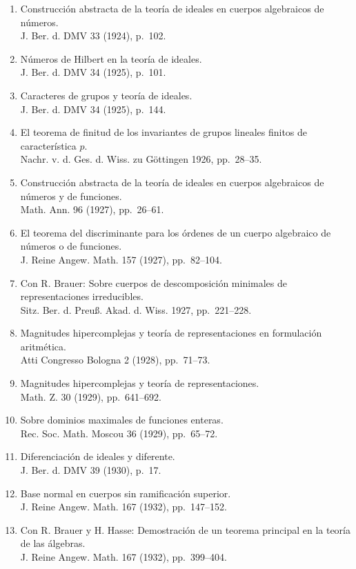 \begin{enumerate}
\item Construcción abstracta de la teoría de ideales en cuerpos algebraicos de números.\\ J. Ber. d. DMV 33 (1924), p.~102.
\item Números de Hilbert en la teoría de ideales.\\ J. Ber. d. DMV 34 (1925), p.~101.
\item Caracteres de grupos y teoría de ideales.\\ J. Ber. d. DMV 34 (1925), p.~144.
\item El teorema de finitud de los invariantes de grupos lineales finitos de característica $p$.\\ Nachr. v. d. Ges. d. Wiss. zu Göttingen 1926, pp.~28--35.
\item Construcción abstracta de la teoría de ideales en cuerpos algebraicos de números y de funciones.\\ Math. Ann. 96 (1927), pp.~26--61.
\item El teorema del discriminante para los órdenes de un cuerpo algebraico de números o de funciones.\\ J. Reine Angew. Math. 157 (1927), pp.~82--104.
\item Con R. Brauer: Sobre cuerpos de descomposición minimales de representaciones irreducibles.\\ Sitz. Ber. d. Preuß. Akad. d. Wiss. 1927, pp.~221--228.
\item Magnitudes hipercomplejas y teoría de representaciones en formulación aritmética.\\ Atti Congresso Bologna 2 (1928), pp.~71--73.
\item[34.] Magnitudes hipercomplejas y teoría de representaciones.\\ Math. Z. 30 (1929), pp.~641--692.
\item[35.] Sobre dominios maximales de funciones enteras.\\ Rec. Soc. Math. Moscou 36 (1929), pp.~65--72.
\item[36.] Diferenciación de ideales y diferente.\\ J. Ber. d. DMV 39 (1930), p.~17.
\item[37.] Base normal en cuerpos sin ramificación superior.\\ J. Reine Angew. Math. 167 (1932), pp.~147--152.
\item[38.] Con R. Brauer y H. Hasse: Demostración de un teorema principal en la teoría de las álgebras.\\ J. Reine Angew. Math. 167 (1932), pp.~399--404.

\end{enumerate}
